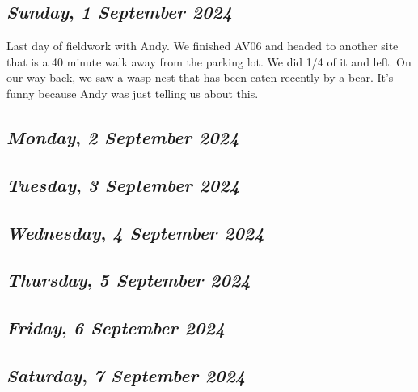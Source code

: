 \begin{center}
\section*{\month}
\end{center}

\def\day{\textit{1 September 2024}}
\def\weekday{\textit{Sunday}}
\subsection*{\weekday, \day}
Last day of fieldwork with Andy. We finished AV06 and headed to another site that is a 40 minute walk away from the parking lot. We did 1/4 of it and left. On our way back, we saw a wasp nest that has been eaten recently by a bear. It's funny because Andy was just telling us about this. 

\def\day{\textit{2 September 2024}}
\def\weekday{\textit{Monday}}
\subsection*{\weekday, \day}


\def\day{\textit{3 September 2024}}
\def\weekday{\textit{Tuesday}}
\subsection*{\weekday, \day}

\def\day{\textit{4 September 2024}}
\def\weekday{\textit{Wednesday}}
\subsection*{\weekday, \day}

\def\day{\textit{5 September 2024}}
\def\weekday{\textit{Thursday}}
\subsection*{\weekday, \day}

\def\day{\textit{6 September 2024}}
\def\weekday{\textit{Friday}}
\subsection*{\weekday, \day}

\def\day{\textit{7 September 2024}}
\def\weekday{\textit{Saturday}}
\subsection*{\weekday, \day}

